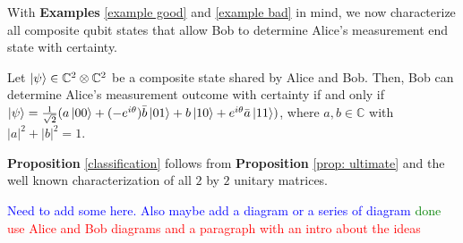 


With {\bf{Examples}} \ref{example good} and \ref{example bad} in mind, we now characterize all composite qubit states that allow Bob to determine Alice's measurement end state with certainty.  
\begin{prop}
\label{classification}
Let $\ket{\psi} \in {\mathbb{C}}^2 \otimes {\mathbb{C}}^2$ be a composite state shared by Alice and Bob.  Then, Bob can determine Alice's measurement outcome with certainty if and only if $\ket{\psi}=\frac{1}{\sqrt{2}}(a\ket{00}+(-e^{i\theta})\Bar{b}\ket{01}+b\ket{10}+e^{i\theta}\Bar{a}\ket{11})$, where $a, b \in \mathbb{C}$ with $|a|^2+|b|^2=1$.
\end{prop}
{\bf{Proposition}} \ref{classification} follows from {\bf{Proposition}} \ref{prop: ultimate} and the well known characterization of all $2$ by $2$ unitary matrices.


\pagebreak

\textcolor{blue}{Need to add some here.  Also maybe add a diagram or a series of diagram} \textcolor{green}{done}
\textcolor{red}{use Alice and Bob diagrams and a paragraph with an intro about the ideas}
